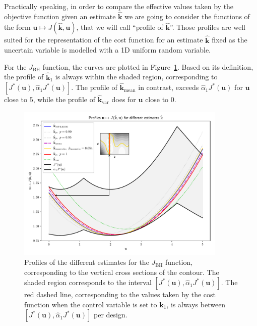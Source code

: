 \documentclass[preprint, 1p]{elsarticle}
\newcommand{\hatkmean}{\hat{\mathbf{k}}_{\mathrm{mean}}}
\newcommand{\hatkvar}{\hat{\mathbf{k}}_{\mathrm{var}}}
\newcommand{\kest}{\hat{\mathbf{k}}}
\newcommand{\checka}{{\alpha}}
\newcommand{\checkk}{\mathbf{k}}
\begin{document}
Practically speaking, in order to compare the effective values taken by the objective function given an estimate $\kest$ we are going to consider the functions of the form $\mathbf{u} \mapsto J(\kest,\mathbf{u})$, that we will call ``profile of $\kest$''. Those profiles are well suited for the representation of the cost function for an estimate $\kest$ fixed as the uncertain variable is modelled with a 1D uniform random variable.

For the $J_{\mathrm{BH}}$ function, the curves are plotted in Figure~\ref{fig:profiles_branin}. Based on its definition, the profile of $\hat{\checkk}_1$ is always within the shaded region, corresponding to $[J^*(\mathbf{u}), \hat{\checka}_1 J^*(\mathbf{u})]$. The profile of $\hatkmean$ in contrast, exceeds $\hat{\checka}_1 J^*(\mathbf{u})$ for $\mathbf{u}$ close to $5$, while the profile of $\hatkvar$ does for $\mathbf{u}$ close to $0$. 

\begin{figure}[t]
  \centering
\includegraphics[width=10cm]{Figures/profile_BH_all_estimates_noku.pdf}
\caption{Profiles of the different estimates for the $J_{\mathrm{BH}}$ function, corresponding to the vertical cross sections of the contour. The shaded region corresponds to the interval $[J^*(\mathbf{u}), \hat{\checka}_1 J^*(\mathbf{u})]$. The red dashed line, corresponding to the values taken by the cost function when the control variable is set to $\mathbf{k}_1$, is always between $[J^*(\mathbf{u}), \hat{\checka}_1 J^*(\mathbf{u})]$ per design.}
\label{fig:profiles_branin}
\end{figure}
\end{document}
